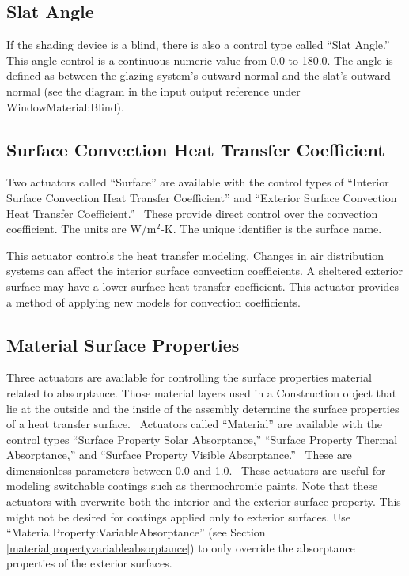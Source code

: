 \subsection{Slat Angle}\label{slat-angle}

If the shading device is a blind, there is also a control type called ``Slat Angle.''~ This angle control is a continuous numeric value from 0.0 to 180.0. The angle is defined as between the glazing system's outward normal and the slat's outward normal (see the diagram in the input output reference under WindowMaterial:Blind).

\subsection{Surface Convection Heat Transfer Coefficient}\label{surface-convection-heat-transfer-coefficient}

Two actuators called ``Surface'' are available with the control types of ``Interior Surface Convection Heat Transfer Coefficient'' and ``Exterior Surface Convection Heat Transfer Coefficient.''~ These provide direct control over the convection coefficient. The units are W/m\(^{2}\)-K. The unique identifier is the surface name.

This actuator controls the heat transfer modeling. Changes in air distribution systems can affect the interior surface convection coefficients. A sheltered exterior surface may have a lower surface heat transfer coefficient. This actuator provides a method of applying new models for convection coefficients.

\subsection{Material Surface Properties}\label{material-surface-properties}

Three actuators are available for controlling the surface properties material
related to absorptance. Those material layers used in a Construction object that
lie at the outside and the inside of the assembly determine the surface
properties of a heat transfer surface.~ Actuators called ``Material'' are
available with the control types ``Surface Property Solar Absorptance,''
``Surface Property Thermal Absorptance,'' and ``Surface Property Visible
Absorptance.''~ These are dimensionless parameters between 0.0 and 1.0.~ These
actuators are useful for modeling switchable coatings such as thermochromic
paints. Note that these actuators with overwrite both the interior and the
exterior surface property. This might not be desired for coatings applied only
to exterior surfaces. Use ``MaterialProperty:VariableAbsorptance'' (see Section
\ref{materialpropertyvariableabsorptance}) to only override the absorptance
properties of the exterior surfaces.

